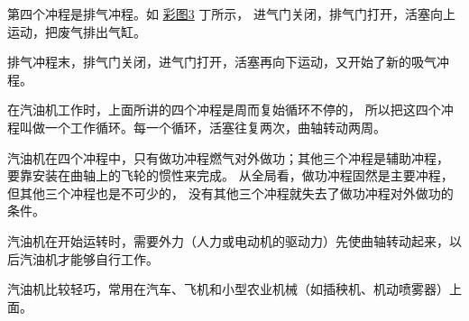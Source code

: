 第四个冲程是排气冲程。如 \hyperref[fig:pic3]{彩图3} 丁所示，
进气门关闭，排气门打开，活塞向上运动，把废气排出气缸。

排气冲程末，排气门关闭，进气门打开，活塞再向下运动，又开始了新的吸气冲程。

在汽油机工作时，上面所讲的四个冲程是周而复始循环不停的，
所以把这四个冲程叫做一个工作循环。每一个循环，活塞往复两次，曲轴转动两周。

汽油机在四个冲程中，只有做功冲程燃气对外做功；其他三个冲程是辅助冲程，
要靠安装在曲轴上的飞轮的惯性来完成。
从全局看，做功冲程固然是主要冲程，但其他三个冲程也是不可少的，
没有其他三个冲程就失去了做功冲程对外做功的条件。

汽油机在开始运转时，需要外力（人力或电动机的驱动力）先使曲轴转动起来，以后汽油机才能够自行工作。

汽油机比较轻巧，常用在汽车、飞机和小型农业机械（如插秧机、机动喷雾器）上面。

